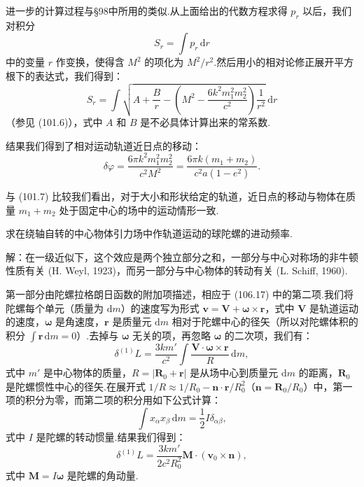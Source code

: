 \begin{xiti}
进一步的计算过程与§98中所用的类似.从上面给出的代数方程求得 $p_r$ 以后，我们对积分
\begin{equation*}
  S_r=\int p_r\,\mathrm{d}r
\end{equation*}
中的变量 $r$ 作变换，使得含 $M^{2}$ 的项化为 $M^{2}/r^{2}$.然后用小的相对论修正展开平方根下的表达式，我们得到：
\begin{equation*}
  S_r=\int\sqrt{A+\frac{B}{r}
  -\left(M^{2}-\frac{6k^{2}m_1^{2}m_2^{2}}{c^{2}}\right)\frac{1}{r^{2}}}
  \,\mathrm{d}r
\end{equation*}
（参见 (101.6)），式中 $A$ 和 $B$ 是不必具体计算出来的常系数.

结果我们得到了相对运动轨道近日点的移动：
\begin{equation*}
  \delta\varphi=\frac{6\pi k^{2}m_1^{2}m_2^{2}}{c^{2}M^{2}}
  =\frac{6\pi k(m_1+m_2)}{c^{2}a(1-e^{2})}.
\end{equation*}

与 (101.7) 比较我们看出，对于大小和形状给定的轨道，近日点的移动与物体在质量 $m_1+m_2$ 处于固定中心的场中的运动情形一致.

\quad 求在绕轴自转的中心物体引力场中作轨道运动的球陀螺的进动频率.

解：在一级近似下，这个效应是两个独立部分之和，一部分与中心对称场的非牛顿性质有关 (H. Weyl, 1923)，而另一部分与中心物体的转动有关 (L. Schiff, 1960).

第一部分由陀螺拉格朗日函数的附加项描述，相应于 (106.17) 中的第二项.我们将陀螺每个单元（质量为 $\mathrm{d}m$）的速度写为形式 $\boldsymbol{v}=\boldsymbol{V}+\boldsymbol{\omega}\times\boldsymbol{r}$，式中 $\boldsymbol{V}$ 是轨道运动的速度，$\boldsymbol{\omega}$ 是角速度，$\boldsymbol{r}$ 是质量元 $\mathrm{d}m$ 相对于陀螺中心的径矢（所以对陀螺体积的积分 $\int\boldsymbol{r}\,\mathrm{d}m=0$）.去掉与 $\boldsymbol{\omega}$ 无关的项，再忽略 $\boldsymbol{\omega}$ 的二次项，我们有：
\begin{equation*}
  \delta^{(1)}L=\frac{3km'}{c^{2}}\int
  \frac{\boldsymbol{V}\cdot\boldsymbol{\omega}\times\boldsymbol{r}}{R}
  \,\mathrm{d}m,
\end{equation*}
式中 $m'$ 是中心物体的质量，$R=|\boldsymbol{R}_0+\boldsymbol{r}|$ 是从场中心到质量元 $\mathrm{d}m$ 的距离，$\boldsymbol{R}_0$ 是陀螺惯性中心的径矢.在展开式 $1/R\approx1/R_0-\boldsymbol{n}\cdot\boldsymbol{r}/R_0^{2}$（$\boldsymbol{n}=\boldsymbol{R}_0/R_0$）中，第一项的积分为零，而第二项的积分用如下公式计算：
\begin{equation*}
  \int x_{\alpha}x_{\beta}\,\mathrm{d}m=\frac{1}{2}I\delta_{\alpha\beta},
\end{equation*}
式中 $I$ 是陀螺的转动惯量.结果我们得到：
\begin{equation*}
  \delta^{(1)}L=\frac{3km'}{2c^{2}R_0^{2}}
  \boldsymbol{M}\cdot(\boldsymbol{v}_0\times\boldsymbol{n}),
\end{equation*}
式中 $\boldsymbol{M}=I\boldsymbol{\omega}$ 是陀螺的角动量.


\end{xiti}

